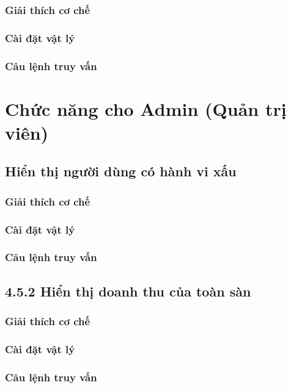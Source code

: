\subsubsection{Giải thích cơ chế}

\subsubsection{Cài đặt vật lý}

\subsubsection{Câu lệnh truy vấn}

\section{Chức năng cho Admin (Quản trị viên)}

\subsection{Hiển thị người dùng có hành vi xấu}

\subsubsection{Giải thích cơ chế}

\subsubsection{Cài đặt vật lý}

\subsubsection{Câu lệnh truy vấn}

\subsection{4.5.2 Hiển thị doanh thu của toàn sàn}

\subsubsection{Giải thích cơ chế}

\subsubsection{Cài đặt vật lý}

\subsubsection{Câu lệnh truy vấn}
